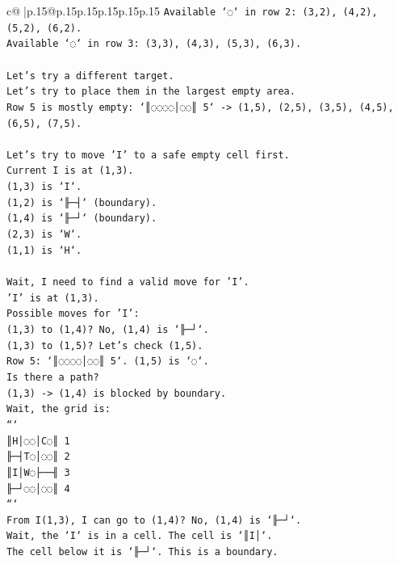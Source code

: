 \documentclass{article}
\begin{document}
{\begin{supertabular}{c@{$\;$}|p{.15\linewidth}@{}p{.15\linewidth}p{.15\linewidth}p{.15\linewidth}p{.15\linewidth}p{.15\linewidth}}
{{{\texttt{Available `◌` in row 2: (3,2), (4,2), (5,2), (6,2).} \\
\texttt{Available `◌` in row 3: (3,3), (4,3), (5,3), (6,3).} \\
\\ 
\texttt{Let's try a different target.} \\
\texttt{Let's try to place them in the largest empty area.} \\
\texttt{Row 5 is mostly empty: `║◌◌◌◌│◌◌║ 5` {-}> (1,5), (2,5), (3,5), (4,5), (6,5), (7,5).} \\
\\ 
\texttt{Let's try to move 'I' to a safe empty cell first.} \\
\texttt{Current I is at (1,3).} \\
\texttt{(1,3) is `I`.} \\
\texttt{(1,2) is `╟─┤` (boundary).} \\
\texttt{(1,4) is `╟─┘` (boundary).} \\
\texttt{(2,3) is `W`.} \\
\texttt{(1,1) is `H`.} \\
\\ 
\texttt{Wait, I need to find a valid move for 'I'.} \\
\texttt{'I' is at (1,3).} \\
\texttt{Possible moves for 'I':} \\
\texttt{(1,3) to (1,4)? No, (1,4) is `╟─┘`.} \\
\texttt{(1,3) to (1,5)? Let's check (1,5).} \\
\texttt{Row 5: `║◌◌◌◌│◌◌║ 5`. (1,5) is `◌`.} \\
\texttt{Is there a path?} \\
\texttt{(1,3) {-}> (1,4) is blocked by boundary.} \\
\texttt{Wait, the grid is:} \\
\texttt{```} \\
\texttt{║H│◌◌│C◌║ 1} \\
\texttt{╟─┤T◌│◌◌║ 2} \\
\texttt{║I│W◌├──╢ 3} \\
\texttt{╟─┘◌◌│◌◌║ 4} \\
\texttt{```} \\
\texttt{From I(1,3), I can go to (1,4)? No, (1,4) is `╟─┘`.} \\
\texttt{Wait, the `I` is in a cell. The cell is `║I│`.} \\
\texttt{The cell below it is `╟─┘`. This is a boundary.} \\
}}}
\end{supertabular}}
\end{document}
